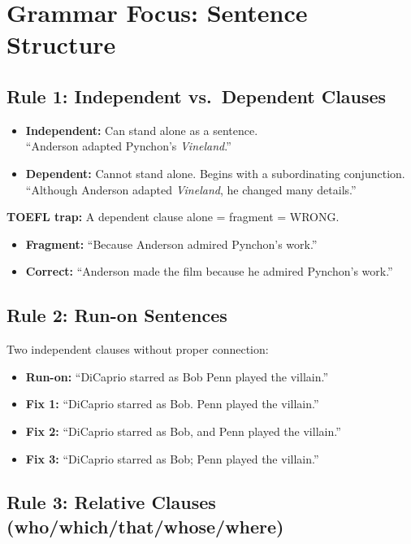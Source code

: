 \documentclass[10pt,a4paper]{article}
\begin{document}
\section*{Grammar Focus: Sentence Structure}

\subsection*{Rule 1: Independent vs.\ Dependent Clauses}

\begin{itemize}[nosep]
\item \textbf{Independent:} Can stand alone as a sentence.\\
``Anderson adapted Pynchon's \emph{Vineland}.''
\item \textbf{Dependent:} Cannot stand alone. Begins with a
subordinating conjunction.\\
``Although Anderson adapted \emph{Vineland}, he changed many details.''
\end{itemize}

\textbf{TOEFL trap:} A dependent clause alone = fragment = WRONG.
\begin{itemize}[nosep]
\item \textbf{Fragment:} ``Because Anderson admired Pynchon's work.''
\item \textbf{Correct:} ``Anderson made the film because he admired
Pynchon's work.''
\end{itemize}

\subsection*{Rule 2: Run-on Sentences}

Two independent clauses without proper connection:
\begin{itemize}[nosep]
\item \textbf{Run-on:} ``DiCaprio starred as Bob Penn played the
villain.''
\item \textbf{Fix 1:} ``DiCaprio starred as Bob. Penn played the
villain.''
\item \textbf{Fix 2:} ``DiCaprio starred as Bob, and Penn played the
villain.''
\item \textbf{Fix 3:} ``DiCaprio starred as Bob; Penn played the
villain.''
\end{itemize}

\subsection*{Rule 3: Relative Clauses (who/which/that/whose/where)}
\end{document}
